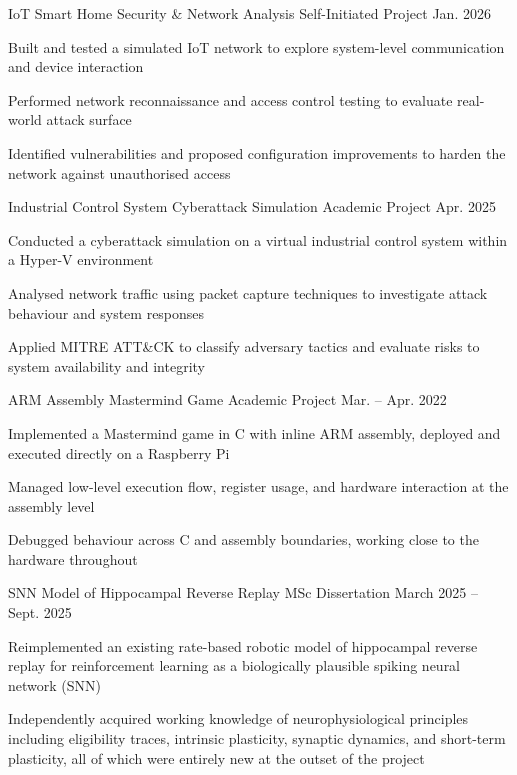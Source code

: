   \itemizeEnd
  \item \projectSubheading
    {IoT Smart Home Security \& Network Analysis}
    {Self-Initiated Project}
    {Jan. 2026}
  \itemizeBegin
    \item Built and tested a simulated IoT network to explore system-level communication and device interaction
    \item Performed network reconnaissance and access control testing to evaluate real-world attack surface
    \item Identified vulnerabilities and proposed configuration improvements to harden the network against unauthorised access
  \itemizeEnd
  \clearpage 
  \item \projectSubheading
    {Industrial Control System Cyberattack Simulation}
    {Academic Project}
    {Apr. 2025}
  \itemizeBegin
    \item Conducted a cyberattack simulation on a virtual industrial control system within a Hyper-V environment
    \item Analysed network traffic using packet capture techniques to investigate attack behaviour and system responses
    \item Applied MITRE ATT\&CK to classify adversary tactics and evaluate risks to system availability and integrity
  \itemizeEnd
  \item \projectSubheading
    {ARM Assembly Mastermind Game}
    {Academic Project}
    {Mar. -- Apr. 2022}
  \itemizeBegin
    \item Implemented a Mastermind game in C with inline ARM assembly, deployed and executed directly on a Raspberry Pi
    \item Managed low-level execution flow, register usage, and hardware interaction at the assembly level
    \item Debugged behaviour across C and assembly boundaries, working close to the hardware throughout
  \itemizeEnd
  \item \projectSubheading
    {SNN Model of Hippocampal Reverse Replay}
    {MSc Dissertation}
    {March 2025 -- Sept. 2025}
  \itemizeBegin
    \item Reimplemented an existing rate-based robotic model of hippocampal reverse replay for reinforcement learning as a biologically plausible spiking neural network (SNN)
    \item Independently acquired working knowledge of neurophysiological principles including eligibility traces, intrinsic plasticity, synaptic dynamics, and short-term plasticity, all of which were entirely new at the outset of the project
